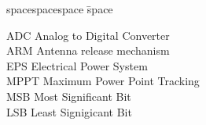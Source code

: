 
\begin{tabbing}
spacespacespace \= space \kill

ADC  \> Analog to Digital Converter\\
ARM \>  Antenna release mechanism\\
EPS \>      Electrical Power System\\
MPPT \>    Maximum Power Point Tracking\\
MSB \>      Most Significant Bit\\
LSB \>      Least Signigicant Bit\\
\end{tabbing}
\endinput
